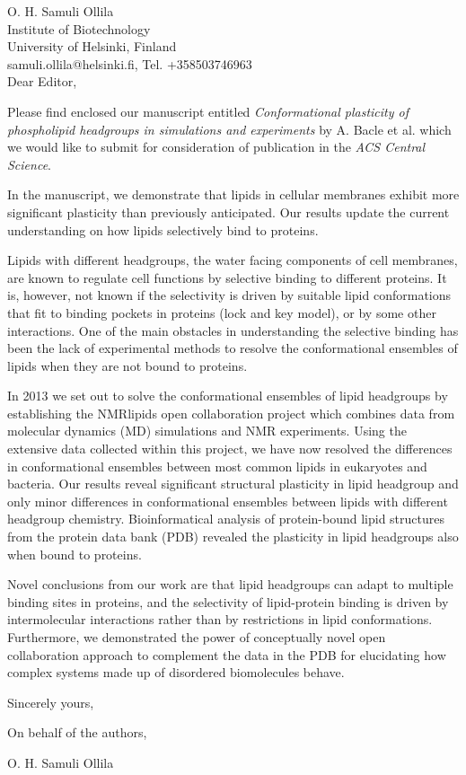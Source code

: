 \documentclass[11pt]{letter}
\begin{document}
\reversemarginpar
\pagestyle{empty}
\noindent O. H. Samuli Ollila \\
\noindent Institute of Biotechnology \\
\noindent University of Helsinki, Finland \\
\noindent samuli.ollila@helsinki.fi, Tel. +358503746963 \\


Dear Editor,

Please find enclosed our manuscript entitled {\it Conformational plasticity of phospholipid headgroups in simulations and experiments}
by A. Bacle et al. which we would like to submit for consideration of publication in the \textit{ACS Central Science}.

In the manuscript, we demonstrate that lipids in cellular membranes exhibit more significant plasticity than previously anticipated.
Our results update the current understanding on how lipids selectively bind to proteins.

Lipids with different headgroups, the water facing components of cell membranes, are known to regulate cell functions
by selective binding to different proteins. It is, however, not known if the selectivity is driven by suitable
lipid conformations that fit to binding pockets in proteins (lock and key model), or by some other interactions.
One of the main obstacles in understanding the selective binding has been the lack of
experimental methods to resolve the conformational ensembles of lipids when they are not bound to proteins.

In 2013 we set out to solve the conformational ensembles of lipid headgroups by establishing the NMRlipids open collaboration project
which combines data from molecular dynamics (MD) simulations and NMR experiments.
Using the extensive data collected within this project, we have now resolved the differences in conformational ensembles
between most common lipids in eukaryotes and bacteria. 
Our results reveal significant structural plasticity in lipid headgroup and only minor differences in conformational ensembles
between lipids with different headgroup chemistry.
Bioinformatical analysis of protein-bound lipid structures from the protein data bank (PDB) revealed the plasticity in
lipid headgroups also when bound to proteins.

Novel conclusions from our work are that lipid headgroups can adapt to multiple binding sites in proteins,
and the selectivity of lipid-protein binding is driven by intermolecular interactions rather than by restrictions in lipid conformations.
Furthermore, we demonstrated the power of conceptually novel open collaboration approach
to complement the data in the PDB for elucidating how complex systems made up of disordered biomolecules behave.




Sincerely yours,

On behalf of the authors,

O. H. Samuli Ollila
\end{document}
